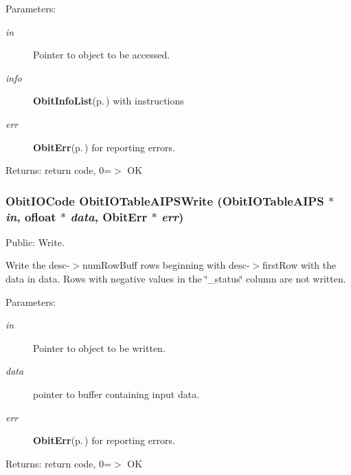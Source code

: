 \begin{Desc}
\item[Parameters:]
\begin{description}
\item[{\em in}]Pointer to object to be accessed. \item[{\em info}]{\bf Obit\-Info\-List}{\rm (p.\,\pageref{structObitInfoList})} with instructions \item[{\em err}]{\bf Obit\-Err}{\rm (p.\,\pageref{structObitErr})} for reporting errors. \end{description}
\end{Desc}
\begin{Desc}
\item[Returns:]return code, 0=$>$ OK \end{Desc}
\subsubsection{\setlength{\rightskip}{0pt plus 5cm}Obit\-IOCode Obit\-IOTable\-AIPSWrite ({\bf Obit\-IOTable\-AIPS} $\ast$ {\em in}, {\bf ofloat} $\ast$ {\em data}, {\bf Obit\-Err} $\ast$ {\em err})}\label{ObitIOTableAIPS_8c_a22}


Public: Write. 

Write the desc-$>$num\-Row\-Buff rows beginning with desc-$>$first\-Row with the data in data. Rows with negative values in the \char`\"{}\_\-status\char`\"{} column are not written. \begin{Desc}
\item[Parameters:]
\begin{description}
\item[{\em in}]Pointer to object to be written. \item[{\em data}]pointer to buffer containing input data. \item[{\em err}]{\bf Obit\-Err}{\rm (p.\,\pageref{structObitErr})} for reporting errors. \end{description}
\end{Desc}
\begin{Desc}
\item[Returns:]return code, 0=$>$ OK \end{Desc}
